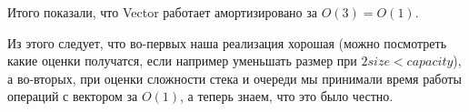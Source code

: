Итого показали, что Vector работает амортизировано за $O(3) = O(1)$.

Из этого следует, что во-первых наша реализация хорошая (можно посмотреть какие оценки получатся, если например уменьшать размер при $2size < capacity$), а во-вторых, при оценки сложности стека и очереди мы принимали время работы операций с вектором за $O(1)$, а теперь знаем, что это было честно.
